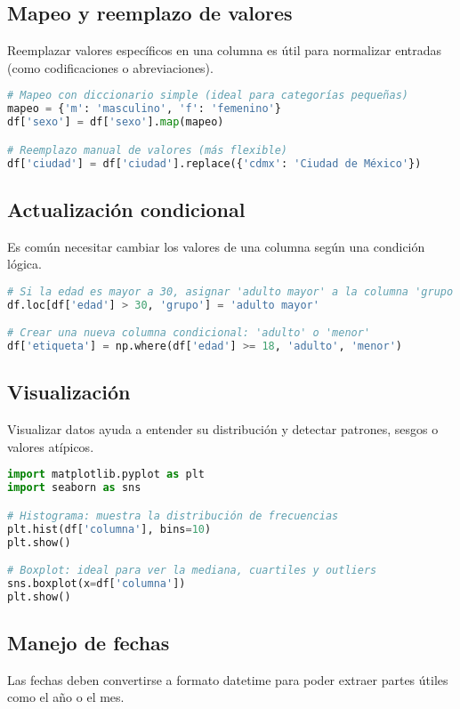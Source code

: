 \documentclass[11pt]{article}
\begin{document}
\subsection*{Mapeo y reemplazo de valores}
Reemplazar valores específicos en una columna es útil para normalizar entradas (como codificaciones o abreviaciones).

\begin{lstlisting}[language=Python]
# Mapeo con diccionario simple (ideal para categorías pequeñas)
mapeo = {'m': 'masculino', 'f': 'femenino'}
df['sexo'] = df['sexo'].map(mapeo)

# Reemplazo manual de valores (más flexible)
df['ciudad'] = df['ciudad'].replace({'cdmx': 'Ciudad de México'})
\end{lstlisting}

\subsection*{Actualización condicional}
Es común necesitar cambiar los valores de una columna según una condición lógica.

\begin{lstlisting}[language=Python]
# Si la edad es mayor a 30, asignar 'adulto mayor' a la columna 'grupo'
df.loc[df['edad'] > 30, 'grupo'] = 'adulto mayor'

# Crear una nueva columna condicional: 'adulto' o 'menor'
df['etiqueta'] = np.where(df['edad'] >= 18, 'adulto', 'menor')
\end{lstlisting}

\subsection*{Visualización}
Visualizar datos ayuda a entender su distribución y detectar patrones, sesgos o valores atípicos.

\begin{lstlisting}[language=Python]
import matplotlib.pyplot as plt
import seaborn as sns

# Histograma: muestra la distribución de frecuencias
plt.hist(df['columna'], bins=10)
plt.show()

# Boxplot: ideal para ver la mediana, cuartiles y outliers
sns.boxplot(x=df['columna'])
plt.show()
\end{lstlisting}

\subsection*{Manejo de fechas}
Las fechas deben convertirse a formato datetime para poder extraer partes útiles como el año o el mes.
\end{document}
